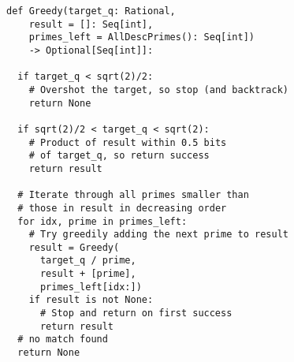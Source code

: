 \begin{figure}
\begin{lstlisting}[label=lst:greedy,caption={
Greedy DFS algorithm for generating residue moduli whose product matches that
of a target modulus.
}]
def Greedy(target_q: Rational,
    result = []: Seq[int],
    primes_left = AllDescPrimes(): Seq[int])
    -> Optional[Seq[int]]:

  if target_q < sqrt(2)/2:
    # Overshot the target, so stop (and backtrack)
    return None

  if sqrt(2)/2 < target_q < sqrt(2):
    # Product of result within 0.5 bits
    # of target_q, so return success
    return result

  # Iterate through all primes smaller than
  # those in result in decreasing order
  for idx, prime in primes_left:
    # Try greedily adding the next prime to result
    result = Greedy(
      target_q / prime,
      result + [prime],
      primes_left[idx:])
    if result is not None:
      # Stop and return on first success
      return result
  # no match found
  return None
\end{lstlisting}
\vspace{-0.1in}
\end{figure}
